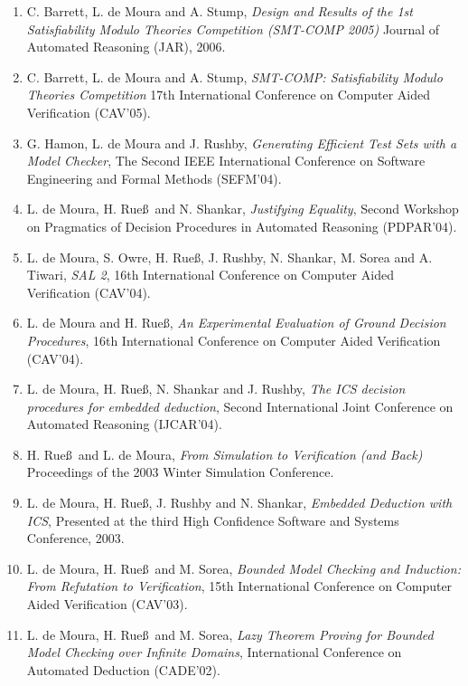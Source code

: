 \documentclass{article}
\begin{document}
\begin{enumerate}
\item C. Barrett, L. de Moura and A. Stump,
{\em Design and Results of the 1st Satisfiability Modulo Theories Competition (SMT-COMP 2005)}
Journal of Automated Reasoning (JAR), 2006.

\item C. Barrett, L. de Moura and A. Stump,
{\em SMT-COMP: Satisfiability Modulo Theories Competition}
17th International Conference on Computer Aided Verification (CAV'05).

\item G. Hamon, L. de Moura and J. Rushby,
{\em Generating Efficient Test Sets with a Model Checker},
The Second IEEE International Conference on Software Engineering and Formal Methods (SEFM'04).

\item L. de Moura, H. Rue\ss\ and N. Shankar,
{\em Justifying Equality},
Second Workshop on Pragmatics of Decision Procedures in Automated Reasoning (PDPAR'04).

\item L. de Moura, S. Owre, H. Rue\ss, J. Rushby, N. Shankar, M. Sorea and A. Tiwari,
{\em SAL 2},
16th International Conference on Computer Aided Verification (CAV'04).

\item L. de Moura and H. Rue\ss,
{\em An Experimental Evaluation of Ground Decision Procedures},
16th International Conference on Computer Aided Verification (CAV'04).

\item L. de Moura, H. Rue\ss, N. Shankar and J. Rushby,
{\em The ICS decision procedures for embedded deduction},
Second International Joint Conference on Automated Reasoning (IJCAR'04).

\item H. Rue\ss\ and L. de Moura,
{\em From Simulation to Verification (and Back)}
Proceedings of the 2003 Winter Simulation Conference.

\item L. de Moura, H. Rue\ss, J. Rushby and N. Shankar,
{\em Embedded Deduction with ICS},
Presented at the third High Confidence Software and Systems Conference, 2003.

\item L. de Moura, H. Rue\ss\ and M. Sorea,
{\em Bounded Model Checking and Induction: From Refutation to Verification},
15th International Conference on Computer Aided Verification (CAV'03).

\item L. de Moura, H. Rue\ss\ and M. Sorea,
{\em Lazy Theorem Proving for Bounded Model Checking over Infinite Domains},
International Conference on Automated Deduction (CADE'02).


\end{enumerate}
\end{document}
